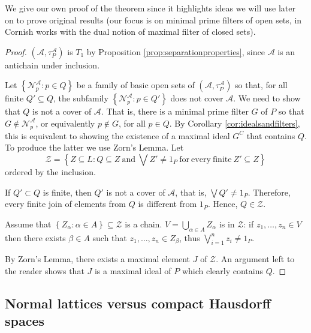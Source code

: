 \documentclass{article}
\newcommand{\aaa}{\mathcal{A} }
\newcommand{\open}[1]{\mathcal{N}^{\mathcal{A}}_{#1}}
\newcommand{\atpa}{(\aaa, \tau^\aaa_P)}
\theoremstyle{plain}
\theoremstyle{definition}
\theoremstyle{remark}
\newcommand{\bp}[1]{\left\lbrace #1 \right\rbrace}
\newcommand{\0}{\mathbbm 0}
\newcommand{\1}{\mathbbm 1}
\newcommand{\2}{\mathbbm 2}
\begin{document}
We give our own proof of the theorem since it highlights ideas we will use later on to prove original results (our focus is on minimal prime filters of open sets, in \cite{Cornish1972NormalL} Cornish works with the dual notion of maximal filter of closed sets).
\begin{proof}
$\atpa$ is $T_1$
by Proposition \ref{prop:separationproperties}, since $\aaa$ is an antichain under inclusion.

    Let $\bp{\open{p}: p \in Q }$ be a family of basic open sets of $\atpa$ so that, for all finite $Q'\subseteq Q$, the subfamily $\bp{\open{p}: p \in Q' }$ does not cover $\aaa$. We need to show that $Q$ is not a cover of $\aaa$. That is, there is a minimal prime filter $G$ of $P$ so that $G\not\in\open{p}$, or equivalently $p\not\in G$, for all $p \in Q$.  By Corollary \ref{cor:idealsandfilters}, this is equivalent to showing the existence of a maximal ideal $G^C$ that contains $Q$. To produce the latter we use Zorn's Lemma.  
Let
\begin{equation*}
    \mathcal{Z}=\bp{Z\subseteq L: Q\subseteq Z \ \mathrm{ and } \  \bigvee Z' \neq 1_P \mathrm{\ for\ every\ finite\ } Z'\subseteq  Z}
\end{equation*}
ordered by the inclusion.

\begin{description}[font=\normalfont\itshape]
 \item [$\mathcal{Z} \neq\emptyset$.] If $Q' \subset Q$ is finite, then $Q'$ is not a cover of $\aaa$, that is, $\bigvee Q'\neq 1_P$. Therefore, every finite join of elements from $Q$ is different from $1_P$. Hence, $Q \in \mathcal{Z}$.
    

    \item [Every chain of $\mathcal{Z}$ admits an upper bound.] Assume that $\bp{Z_\alpha: \alpha \in A} \subseteq \mathcal{Z}$ is a chain. $V=\bigcup_{\alpha \in A} Z_\alpha $ is in $\mathcal{Z}$: if $z_1, \dots, z_n \in V$ then there exists $\beta \in A$ such that $z_1, \dots, z_n \in Z_\beta$, thus $\bigvee_{i=1}^n z_i \neq 1_P$.
\end{description}


By Zorn's Lemma, there exists a maximal element $J$ of $\mathcal{Z}$. An argument left to the reader shows that $J$ is a maximal ideal of $P$ which clearly contains $Q$. 
\end{proof}


\subsection{Normal lattices versus compact Hausdorff spaces}
\label{subsec:normallattices}
\end{document}
